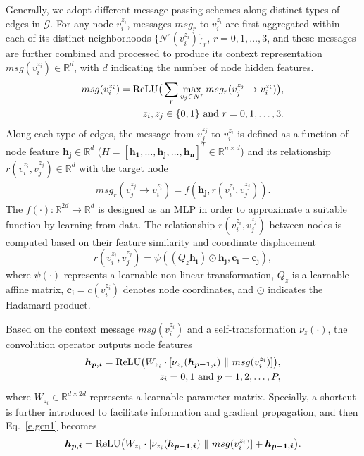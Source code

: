 \documentclass[letterpaper, 10 pt, conference]{ieeeconf}
\begin{document}
Generally,  we adopt different message passing schemes along distinct types of edges in $\mathcal{G}$. For any node $v_i^{z_i}$, messages $msg_r$ to  $v_i^{z_i}$ are first aggregated  within each of its distinct neighborhoods $\{N^r(v_i^{z_i})\}_r$, $ r=0,1,\dots,3$, and these messages are further combined and processed to produce its context representation $msg(v_i^{z_i}) \in \mathbb{R}^d$, with $d$ indicating the number of node hidden features.
\begin{equation}\label{e.msg}
\begin{split}
msg(v_i^{z_i})= {\rm ReLU} \big( \sum_{r} \max_{v_j \in N^r} msg_r(v_j^{z_j} \rightarrow v_i^{z_i}) \big), \\ \ z_i, z_j \in \{0,1\} \ \text{and} \ r=0,1,\dots,3.
\end{split}
\end{equation}
Along each type of edges, the message from $v_j^{z_j}$ to $v_i^{z_i}$ is defined as a function of node feature $\bm{h_j} \in \mathbb{R}^d$ ($H=\left[\bm{h_{1}}, \dots, \bm{h_j}, \dots, \bm{h_{n}} \right]^T \in \mathbb{R}^{n \times d}$) and its relationship $r(v_i^{z_i},v_j^{z_j}) \in \mathbb{R}^d$ with the target node
\begin{gather}
  msg_r(v_j^{z_j} \rightarrow v_i^{z_i})=  f(\bm{h_j}, r(v_i^{z_i}, v_j^{z_j})) .
\end{gather}
The $f(\cdot): \mathbb{R}^{2d} \rightarrow \mathbb{R}^{d}$ is designed  as an MLP in order to  approximate a suitable function by learning from data.  The relationship $r(v_i^{z_i},v_j^{z_j})$ between nodes is computed based on their feature similarity and coordinate displacement
\begin{equation}
r(v_i^{z_i},v_j^{z_j})=\psi( (Q_z\bm{h_i}) \odot \bm{h_j},\bm{c_i}-\bm{c_j}),
\end{equation}
where $\psi(\cdot)$ represents a learnable non-linear transformation, $Q_z$ is a learnable affine matrix, $\bm{c_i}=c(v_i^{z_i})$ denotes node coordinates, and $\odot$ indicates the Hadamard product. 

Based on the context message $msg(v_i^{z_i})$ and a self-transformation $\nu_z(\cdot)$,
the convolution operator outputs node features
\begin{gather}
\begin{split}
\bm{h_{p,i}}={\rm ReLU} \big(W_{z_i} \cdot [ \nu_{z_i}(\bm{h_{p-1,i}}) \ \| \  msg(v_i^{z_i})] \big),  \\ z_i= 0, 1 \ \text{and} \ p=1,2, \dots, P, \label{e.gcn1}    
\end{split}
\end{gather}
where $W_{z_i} \in \mathbb{R}^{d \times 2d}$ represents a learnable parameter matrix.
Specially, a shortcut is further introduced to facilitate information and gradient propagation, and then Eq.~\eqref{e.gcn1} becomes
\begin{gather}\label{e.gcn}
\begin{split}
\bm{h_{p,i}}={\rm ReLU} \big(W_{z_i} \cdot [ \nu_{z_i}(\bm{h_{p-1,i}}) \ \| \  msg(v_i^{z_i})] + \bm{h_{p-1,i}} \big).
\end{split}
\end{gather}
\end{document}
